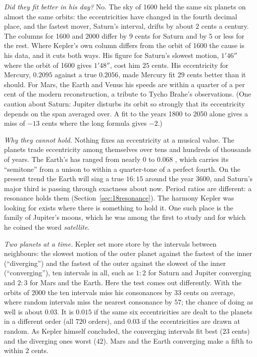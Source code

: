 \emph{Did they fit better in his day?} No. The sky of 1600 held the same six planets on almost the same
orbits: the eccentricities have changed in the fourth decimal place, and the fastest mover, Saturn's
interval, drifts by about $2$ cents a century. The columns for 1600 and 2000 differ by $9$ cents for
Saturn and by $5$ or less for the rest. Where Kepler's own column differs from the orbit of 1600 the cause
is his data, and it cuts both ways. His figure for Saturn's slowest motion, $1'46''$ where the orbit of 1600 gives $1'48''$, cost him $25$
cents. His eccentricity for Mercury, $0.2095$ against a true $0.2056$, made Mercury fit $29$ cents better
than it should. For Mars, the Earth and Venus his speeds are within a quarter of a per cent of the modern
reconstruction, a tribute to Tycho Brahe's observations. (One caution about Saturn: Jupiter
disturbs its orbit so strongly that its eccentricity depends on the span averaged over. A fit to the years
1800 to 2050 alone gives a miss of $-13$ cents where the long formula gives $-2$.)

\emph{Why they cannot hold.} Nothing fixes an eccentricity at a musical value. The planets trade
eccentricity among themselves over tens and hundreds of thousands of years. The Earth's has ranged from
nearly $0$ to $0.068$ \cite{laskar2011}, which carries its ``semitone'' from a unison to within a
quarter-tone of a perfect fourth. On the present trend the Earth will sing a true $16:15$ around the year
3600, and Saturn's major third is passing through exactness about now. Period ratios are different: a
resonance holds them (Section~\ref{sec:18resonance}). The harmony Kepler was looking for exists where
there is something to hold it. One such place is the family of Jupiter's moons, which he was among the
first to study and for which he coined the word \emph{satellite}.

\emph{Two planets at a time.} Kepler set more store by the intervals between neighbours: the slowest motion
of the outer planet against the fastest of the inner (``diverging'') and the fastest of the outer against
the slowest of the inner (``converging''), ten intervals in all, such as $1:2$ for Saturn and Jupiter
converging and $2:3$ for Mars and the Earth. Here the test comes out differently. With the orbits of 2000
the ten intervals miss his consonances by $33$ cents on average, where random intervals miss the nearest
consonance by $57$; the chance of doing as well is about $0.03$. It is $0.015$ if the same six
eccentricities are dealt to the planets in a different order (all $720$ orders), and $0.03$ if the
eccentricities are drawn at random. As Kepler himself concluded, the converging intervals fit best ($23$
cents) and the diverging ones worst ($42$). Mars and the Earth converging make a fifth to within $2$
cents.

